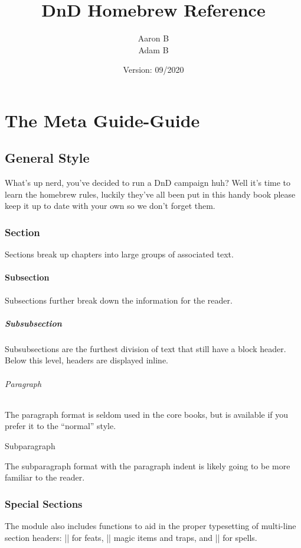 \documentclass[10pt,twoside,twocolumn,nomultitoc,openany,nodeprecatedcode]{dndbook}
\title{DnD Homebrew Reference}
\author{Aaron B \\ Adam B}
\date{Version: 09/2020}
\begin{document}
	\maketitle
	
	\tableofcontents

	\part{The Meta Guide-Guide}
	\chapter{General Style}
	What's up nerd, you've decided to run a DnD campaign huh? Well it's time to learn the homebrew rules, luckily they've all been put in this handy book please keep it up to date with your own so we don't forget them.
	
	\section{Section}
	Sections break up chapters into large groups of associated text.
	
	\subsection{Subsection}
	Subsections further break down the information for the reader.
	
	\subsubsection{Subsubsection}
	Subsubsections are the furthest division of text that still have a block header. Below this level, headers are displayed inline.
	
	\paragraph{Paragraph}
	The paragraph format is seldom used in the core books, but is available if you prefer it to the ``normal'' style.
	
	\subparagraph{Subparagraph}
	The subparagraph format with the paragraph indent is likely going to be more familiar to the reader.
	
	\section{Special Sections}
	The module also includes functions to aid in the proper typesetting of multi-line section headers: |\DndFeatHeader| for feats, |\DndItemHeader| magic items and traps, and |\DndSpellHeader| for spells.
	
\end{document}
